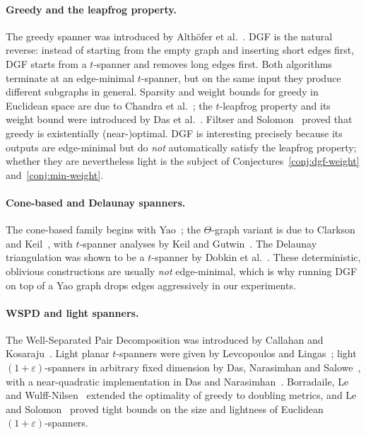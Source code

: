 \documentclass{cccg26}
\begin{document}
\paragraph{Greedy and the leapfrog property.}
The greedy spanner was introduced by Alth\"ofer et
al.~\cite{ADDJS93}. DGF is the natural reverse: instead of starting
from the empty graph and inserting short edges first, DGF starts from
a $t$-spanner and removes long edges first. Both algorithms terminate
at an edge-minimal $t$-spanner, but on the same input they produce
different subgraphs in general. Sparsity and weight bounds for greedy
in Euclidean space are due to Chandra et al.~\cite{CDNS95}; the
$t$-leapfrog property and its weight bound were introduced by Das et
al.~\cite{DHN93,DNS95}. Filtser and Solomon~\cite{FS20} proved that
greedy is existentially (near-)optimal. DGF is interesting precisely
because its outputs are edge-minimal but do \emph{not} automatically
satisfy the leapfrog property; whether they are nevertheless light is
the subject of Conjectures~\ref{conj:dgf-weight}
and~\ref{conj:min-weight}.

\paragraph{Cone-based and Delaunay spanners.}
The cone-based family begins with Yao~\cite{Yao82}; the
$\Theta$-graph variant is due to Clarkson~\cite{Clarkson87} and
Keil~\cite{Keil88}, with $t$-spanner analyses by Keil and
Gutwin~\cite{KG92}. The Delaunay triangulation was shown to be a
$t$-spanner by Dobkin et al.~\cite{DFS90}. These deterministic,
oblivious constructions are usually \emph{not} edge-minimal, which is
why running DGF on top of a Yao graph drops edges aggressively in our
experiments.

\paragraph{WSPD and light spanners.}
The Well-Separated Pair Decomposition was introduced by Callahan and
Kosaraju~\cite{CK95}. Light planar $t$-spanners were given by
Levcopoulos and Lingas~\cite{LL92}; light $(1+\varepsilon)$-spanners
in arbitrary fixed dimension by Das, Narasimhan and Salowe~\cite{DNS95},
with a near-quadratic implementation in Das and Narasimhan~\cite{DN97}.
Borradaile, Le and Wulff-Nilsen~\cite{BLW19} extended the optimality
of greedy to doubling metrics, and Le and Solomon~\cite{LS25} proved
tight bounds on the size and lightness of Euclidean
$(1+\varepsilon)$-spanners.
\end{document}
